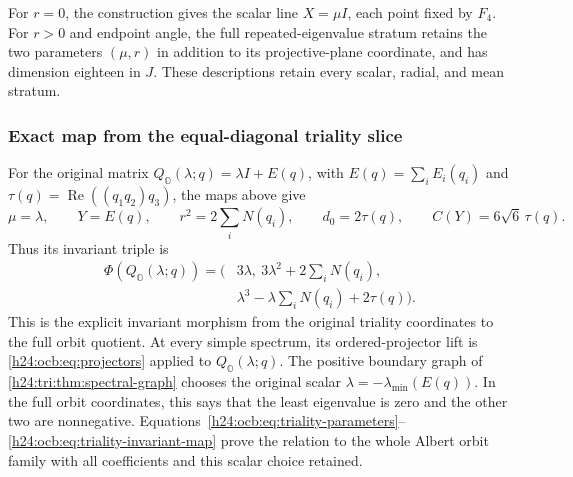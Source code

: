 For $r=0$, the construction gives the scalar line $X=\mu I$,
each point fixed by $F_4$. For $r>0$ and endpoint angle, the full
repeated-eigenvalue stratum retains the two parameters $(\mu,r)$
in addition to its projective-plane coordinate, and has dimension
eighteen in $J$. These descriptions retain every scalar, radial,
and mean stratum.

\subsubsection{Exact map from the equal-diagonal triality slice}
\label{h24:ocb:sec:triality-slice}

For the original matrix
$Q_{\mathbb O}(\lambda;q)=\lambda I+E(q)$, with
$E(q)=\sum_iE_i(q_i)$ and
$\tau(q)=\operatorname{Re}((q_1q_2)q_3)$, the maps above give
\begin{equation}
 \mu=\lambda,\qquad Y=E(q),\qquad
 r^2=2\sum_iN(q_i),\qquad d_0=2\tau(q),\qquad
 C(Y)=6\sqrt6\,\tau(q).
 \label{h24:ocb:eq:triality-parameters}\tag{OCB36}
\end{equation}
Thus its invariant triple is
\begin{equation}
 \begin{aligned}
 \Phi(Q_{\mathbb O}(\lambda;q))
 =\bigl(&3\lambda,\ 3\lambda^2+2\sum_iN(q_i),\\
        &\lambda^3-\lambda\sum_iN(q_i)+2\tau(q)\bigr).
 \end{aligned}
 \label{h24:ocb:eq:triality-invariant-map}\tag{OCB37}
\end{equation}
This is the explicit invariant morphism from the original triality
coordinates to the full orbit quotient. At every simple spectrum,
its ordered-projector lift is \eqref{h24:ocb:eq:projectors} applied to
$Q_{\mathbb O}(\lambda;q)$. The positive boundary graph of
\cref{h24:tri:thm:spectral-graph} chooses the original scalar
$\lambda=-\lambda_{\min}(E(q))$. In the full orbit coordinates,
this says that the least eigenvalue is zero and the other two are
nonnegative. Equations~\eqref{h24:ocb:eq:triality-parameters}--
\eqref{h24:ocb:eq:triality-invariant-map} prove the relation to the whole
Albert orbit family with all coefficients and this scalar choice
retained.

